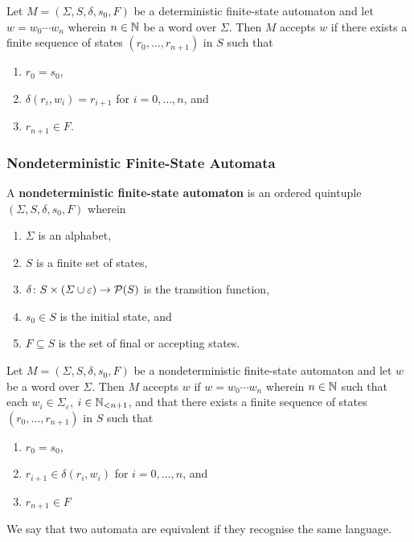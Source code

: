 Let \(M = (\varSigma, S, \delta, s_0, F)\) be a deterministic finite-state
automaton and let \(w = w_0 \cdots w_n\) wherein \(n \in \setnat\) be a word
over \(\varSigma\).  Then \(M\) accepts \(w\) if there exists a finite sequence
of states \((r_0, \ldots, r_{n + 1})\) in \(S\) such that
\begin{enumerate}
    \item \(r_0 = s_0\),
    \item \(\delta(r_i, w_i) = r_{i + 1}\) for \(i = 0, \ldots, n\), and
    \item \(r_{n + 1} \in F\).
\end{enumerate}

\subsubsection{Nondeterministic Finite-State Automata}

\Bdf
    A {\bf nondeterministic finite-state automaton} is an ordered quintuple
    \((\varSigma, S, \delta, s_0, F)\) wherein
    \begin{enumerate}
        \item \(\varSigma\) is an alphabet,
        \item \(S\) is a finite set of states,
        \item \(\map{\delta}{S \times (\varSigma \cup \varepsilon)}{\pow(S)}\)
        is the transition function,
        \item \(s_0 \in S\) is the initial state, and
        \item \(F \subseteq S\) is the set of final or accepting states.
    \end{enumerate}
\Edf

Let \(M = (\varSigma, S, \delta, s_0, F)\) be a nondeterministic finite-state
automaton and let \(w\) be a word over \(\varSigma\). Then \(M\) accepts \(w\)
if \(w = w_0 \cdots w_n\) wherein \(n \in \setnat\) such that each \(w_i \in
\varSigma_\varepsilon\), \(i \in \Nln[n + 1]\), and that there exists a finite
sequence of states \((r_0, \ldots, r_{n + 1})\) in \(S\) such that
\begin{enumerate}
    \item \(r_0 = s_0\),
    \item \(r_{i + 1} \in \delta(r_i, w_i)\) for \(i = 0, \ldots, n\), and
    \item \(r_{n + 1} \in F\)
\end{enumerate}

We say that two automata are equivalent if they recognise the same language.

